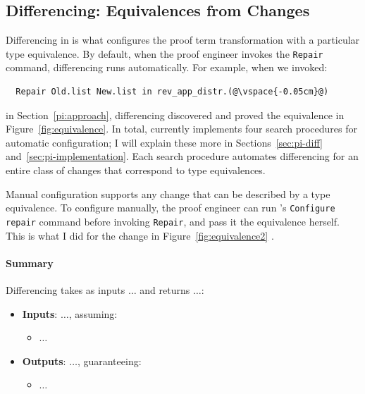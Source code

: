\subsection{Differencing: Equivalences from Changes}
\label{sec:pi-spec-diff}

Differencing in \toolnamec is what configures the proof term transformation with a particular type equivalence.
By default, when the proof engineer invokes the \lstinline{Repair} command, differencing runs automatically.
For example, when we invoked:

\begin{lstlisting}
  Repair Old.list New.list in rev_app_distr.(@\vspace{-0.05cm}@)
\end{lstlisting}
in Section~\ref{pi:approach}, differencing discovered and proved the equivalence in Figure~\ref{fig:equivalence}.
In total, \toolnamec currently implements four search procedures for automatic configuration;
I will explain these more in Sections~\ref{sec:pi-diff} and~\ref{sec:pi-implementation}.
Each search procedure automates differencing for an entire class of changes that correspond to type equivalences. 

Manual configuration supports any change that can be described by a type equivalence.
To configure \toolnamec manually, the proof engineer can run \toolnamec's \lstinline{Configure repair} command before invoking \lstinline{Repair},
and pass it the equivalence herself.
This is what I did for the change in Figure~\ref{fig:equivalence2} \href{https://github.com/uwplse/pumpkin-pi/blob/v2.0.0/plugin/coq/playground/constr_refactor.v}{}.

\paragraph{Summary}

Differencing takes as inputs $\ldots$ and returns $\ldots$:

\begin{itemize}
\item \textbf{Inputs}: $\ldots$, assuming:
\begin{itemize}
\item $\ldots$
\end{itemize}
\item \textbf{Outputs}: $\ldots$, guaranteeing:
\begin{itemize}
\item $\ldots$
\end{itemize}
\end{itemize}

